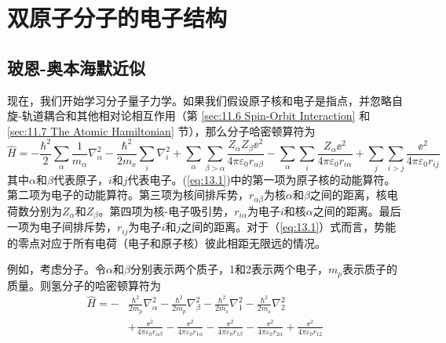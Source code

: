 \chapter{双原子分子的电子结构}
\label{chap:13}
\section{玻恩-奥本海默近似}
\label{sec:13.1 The Born-Oppenheimer Approximation}

    现在，我们开始学习分子量子力学。如果我们假设原子核和电子是指点，并忽略自旋-轨道耦合和其他相对论相互作用（第 \ref{sec:11.6 Spin-Orbit Interaction} 和 \ref{sec:11.7 The Atomic Hamiltonian} 节），那么分子哈密顿算符为
    \begin{equation}
        \hat{H} = -\frac{\hbar^2}{2}\sum_{\alpha} \frac{1}{m_{\alpha}}\nabla_{\alpha}^2 - \frac{\hbar^2}{2m_{\ee }}\sum_i \nabla_i^2 + \sum_{\alpha}\sum_{\beta>\alpha} \frac{Z_{\alpha}Z_{\beta}\ee ^2}{4\pi\varepsilon_0 r_{\alpha\beta}} - \sum_{\alpha}\sum_i \frac{Z_{\alpha}\ee ^2}{4\pi\varepsilon_0 r_{i\alpha}} + \sum_j\sum_{i>j} \frac{\ee ^2}{4\pi\varepsilon_0 r_{ij}}
        \label{eq:13.1}
    \end{equation}
    其中$\alpha$和$\beta$代表原子，$i$和$j$代表电子。(\ref{eq:13.1})中的第一项为原子核的动能算符。第二项为电子的动能算符。第三项为核间排斥势，$r_{\alpha\beta}$为核$\alpha$和$\beta$之间的距离，核电荷数分别为$Z_{\alpha}$和$Z_{\beta}$。第四项为核-电子吸引势，$r_{i\alpha}$为电子$i$和核$\alpha$之间的距离。最后一项为电子间排斥势，$r_{ij}$为电子$i$和$j$之间的距离。对于（\ref{eq:13.1}）式而言，势能的零点对应于所有电荷（电子和原子核）彼此相距无限远的情况。

    例如，考虑分子。令$\alpha$和$\beta$分别表示两个质子，1和2表示两个电子，$m_p$表示质子的质量。则氢分子的哈密顿算符为
    \begin{equation}
        \begin{aligned}
            \hat{H} = -&\frac{\hbar^2}{2m_p} \nabla^2_{\alpha}- \frac{\hbar^2}{2m_p} \nabla^2_{\beta}- \frac{\hbar^2}{2m_\ee } \nabla^2_1 - \frac{\hbar^2}{2m_\ee } \nabla^2_2 \\
            &+ \frac{\ee ^2}{4\pi\varepsilon_0 r_{\alpha\beta}} - \frac{\ee ^2}{4\pi\varepsilon_0 r_{1\alpha}} - \frac{\ee ^2}{4\pi\varepsilon_0 r_{1\beta}} - \frac{\ee ^2}{4\pi\varepsilon_0 r_{2\alpha}} + \frac{\ee ^2}{4\pi\varepsilon_0 r_{12}}
        \end{aligned}
        \label{eq:13.2}
    \end{equation}

